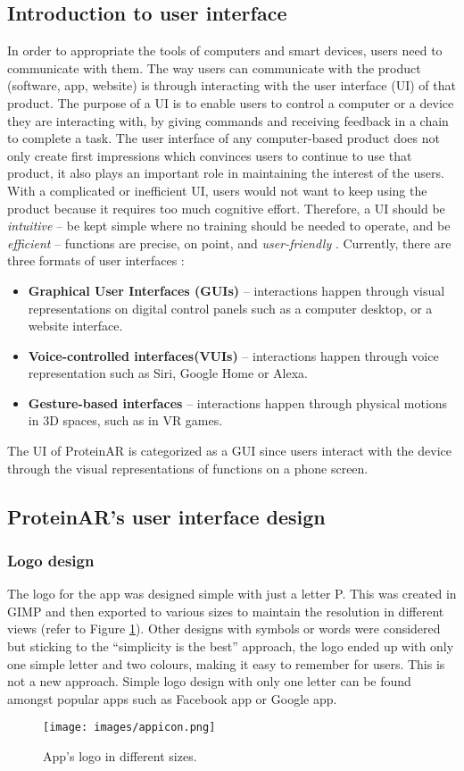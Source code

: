 \subsection{Introduction to user interface}
In order to appropriate the tools of computers and smart devices, users need to communicate with them. The way users can communicate with the product (software, app, website) is through interacting with the user interface (UI) of that product. The purpose of a UI is to enable users to control a computer or a device they are interacting with, by giving commands and receiving feedback in a chain to complete a task. 
The user interface of any computer-based product does not only create first impressions which convinces users to continue to use that product, it also plays an important role in maintaining the interest of the users. With a complicated or inefficient UI, users would not want to keep using the product because it requires too much cognitive effort. Therefore, a UI should be \emph{intuitive} – be kept simple where no training should be needed to operate, and be \emph{efficient} – functions are precise, on point, and \emph{user-friendly} \parencite{noauthor_what_nodate}.
Currently, there are three formats of user interfaces \parencite{noauthor_what_nodate}:
\begin{itemize}
\item \textbf{Graphical User Interfaces (GUIs)} – interactions happen through visual representations on digital control panels such as a computer desktop, or a website interface.
\item \textbf{Voice-controlled interfaces(VUIs)} – interactions happen through voice representation such as Siri, Google Home or Alexa.
\item \textbf{Gesture-based interfaces} – interactions happen through physical motions in 3D spaces, such as in VR games.
\end{itemize}
The UI of ProteinAR is categorized as a GUI since users interact with the device through the visual representations of functions on a phone screen. 

\subsection{ProteinAR’s user interface design}
\subsubsection{Logo design}
The logo for the app was designed simple with just a letter P. This was created in GIMP and then exported to various sizes to maintain the resolution in different views (refer to Figure \ref{fig:appicon}). Other designs with symbols or words were considered but sticking to the “simplicity is the best” approach, the logo ended up with only one simple letter and two colours, making it easy to remember for users. This is not a new approach. Simple logo design with only one letter can be found amongst popular apps such as Facebook app or Google app. 
\begin{figure}[!htp]
	\centering
	\texttt{[image: images/appicon.png]}
	\caption{App’s logo in different sizes.}
	\label{fig:appicon}
\end{figure}

